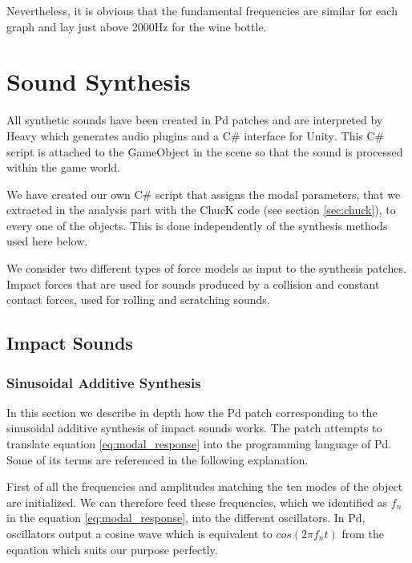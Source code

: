 Nevertheless, it is obvious that the fundamental frequencies are similar for each graph and lay just above 2000Hz for the wine bottle.

\section{Sound Synthesis}\label{sec:synthesis_implem}

All synthetic sounds have been created in Pd patches and are interpreted by Heavy which generates audio plugins and a C\# interface for Unity\textsuperscript{\textregistered}. This C\# script is attached to the GameObject in the scene so that the sound is processed within the game world.

We have created our own C\# script that assigns the modal parameters, that we extracted in the analysis part with the ChucK code (see section \ref{sec:chuck}), to every one of the objects. This is done independently of the synthesis methods used here below.

We consider two different types of force models as input to the synthesis patches. Impact forces that are used for sounds produced by a collision and constant contact forces, used for rolling and scratching sounds.



\subsection{Impact Sounds}\label{sec:impact_synth}
%
\subsubsection{Sinusoidal Additive Synthesis}\label{sec:sinusoidal_synth}

In this section we describe in depth how the Pd patch corresponding to the sinusoidal additive synthesis of impact sounds works. The patch attempts to translate equation \ref{eq:modal_response} into the programming language of Pd. Some of its terms are referenced in the following explanation.

First of all the frequencies and amplitudes matching the ten modes of the object are initialized. We can therefore feed these frequencies, which we identified as $f_n$ in the equation \ref{eq:modal_response}, into the different oscillators. In Pd, oscillators output a cosine wave which is equivalent to $cos(2 \pi f_nt)$ from the equation which suits our purpose perfectly.

